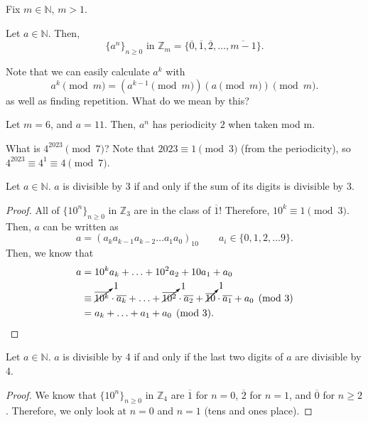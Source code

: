 
Fix \( m \in \mathbb{N} \), \( m>1 \).

Let \( a \in \mathbb{N} \). Then, \[
	\{a^n\}_{n\ge 0} \text{ in } \mathbb{Z}_m=\{\overline{0},\overline{1},\overline{2},\ldots ,\overline{m-1}    \}  
.\] 

Note that we can easily calculate \( a^k \) with \[ a^k \pmod m= \left( a^{k-1} \pmod m \right) \left( a \pmod m \right) \pmod m .\] as well as finding repetition. What do we mean by this?

\begin{eg}
	Let \( m=6 \), and \( a=11 \). Then, \( a^n \) has periodicity \( 2 \) when taken mod m.
\end{eg}

\begin{eg}
	What is \( 4^{2023} \pmod 7 \)? Note that \( 2023 \equiv 1 \pmod 3 \) (from the periodicity), so \( 4^{2023}\equiv 4^1 \equiv 4 \pmod 7  \).
\end{eg}

\begin{theorem}
	Let \( a \in \mathbb{N} \). \( a \) is divisible by 3 if and only if the sum of its digits is divisible by 3.
\end{theorem}

\begin{proof}
	All of \( \{10^n\}_{n\ge 0}  \) in \( \mathbb{Z}_3 \) are in the class of \( \overline{1}  \)! Therefore, \( 10^k \equiv 1 \pmod 3 \). Then, \( a \) can be written as \[
		a = (a_k a_{k-1} a_{k-2}\ldots a_{1}a_{0})_{10} \qquad a_i \in \{0,1,2,\ldots 9\}  
	.\] Then, we know that
	\begin{align*}
		a &= 10^k a_k + \ldots  + 10^2 a_2 + 10 a_1 + a_0 \\
			&\equiv \cancelto{1}{\overline{10^k}}\cdot \overline{a_k} + \ldots  + \cancelto{1}{\overline{10^2}}\cdot \overline{a_2}  + \cancelto{1}{\overline{10} }\cdot \overline{a_1} + a_{0} \pmod 3 \\
			&= a_k + \ldots  + a_{1} + a_{0} \pmod 3
	.\end{align*}
\end{proof}

\begin{theorem}
	Let \( a \in \mathbb{N} \). \( a \) is divisible by 4 if and only if the last two digits of \( a \) are divisible by 4.
\end{theorem}

\begin{proof}
	We know that \( \{10^n\} _{n\ge 0}  \) in \( \mathbb{Z}_{4} \) are \( \overline{1}  \) for \( n=0 \), \( \overline{2}  \) for \( n=1 \), and \( \overline{0}  \) for \( n\ge 2   \). Therefore, we only look at \( n=0 \) and \( n=1 \) (tens and ones place).
\end{proof} 

